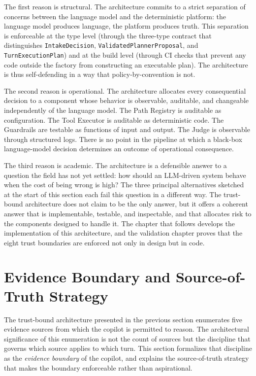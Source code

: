 The first reason is structural. The architecture commits to a strict separation of concerns between the language model and the deterministic platform: the language model produces language, the platform produces truth. This separation is enforceable at the type level (through the three-type contract that distinguishes \texttt{IntakeDecision}, \texttt{ValidatedPlannerProposal}, and \texttt{TurnExecutionPlan}) and at the build level (through CI checks that prevent any code outside the factory from constructing an executable plan). The architecture is thus self-defending in a way that policy-by-convention is not.

The second reason is operational. The architecture allocates every consequential decision to a component whose behavior is observable, auditable, and changeable independently of the language model. The Path Registry is auditable as configuration. The Tool Executor is auditable as deterministic code. The Guardrails are testable as functions of input and output. The Judge is observable through structured logs. There is no point in the pipeline at which a black-box language-model decision determines an outcome of operational consequence.

The third reason is academic. The architecture is a defensible answer to a question the field has not yet settled: how should an LLM-driven system behave when the cost of being wrong is high? The three principal alternatives sketched at the start of this section each fail this question in a different way. The trust-bound architecture does not claim to be the only answer, but it offers a coherent answer that is implementable, testable, and inspectable, and that allocates risk to the components designed to handle it. The chapter that follows develops the implementation of this architecture, and the validation chapter proves that the eight trust boundaries are enforced not only in design but in code.

\section{Evidence Boundary and Source-of-Truth Strategy}
The trust-bound architecture presented in the previous section enumerates five evidence sources from which the copilot is permitted to reason. The architectural significance of this enumeration is not the count of sources but the discipline that governs which source applies to which turn. This section formalizes that discipline as the \textit{evidence boundary} of the copilot, and explains the source-of-truth strategy that makes the boundary enforceable rather than aspirational.

